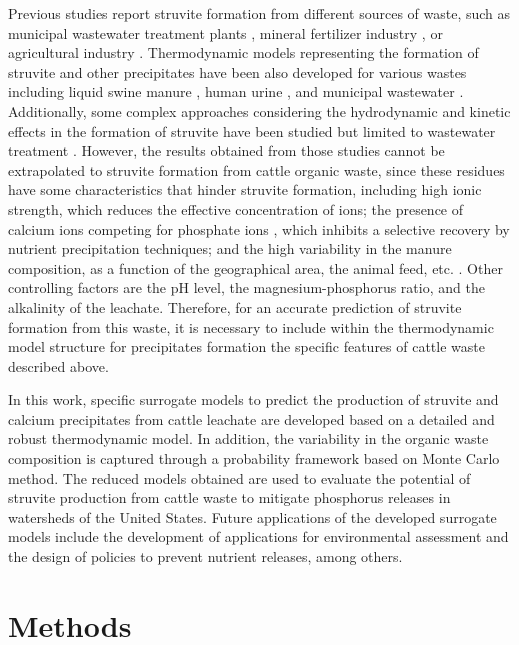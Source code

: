 \documentclass[10pt,a4paper]{article}
\begin{document}
Previous studies report struvite formation from different sources of waste, such as municipal wastewater treatment plants , mineral fertilizer industry , or agricultural industry . Thermodynamic models representing the formation of struvite and other precipitates have been also developed for various wastes including liquid swine manure , human urine , and municipal wastewater . Additionally, some complex approaches considering the hydrodynamic and kinetic effects in the formation of struvite have been studied but limited to wastewater treatment . However, the results obtained from those studies cannot be extrapolated to struvite formation from cattle organic waste, since these residues have some characteristics that hinder struvite formation, including high ionic strength, which reduces the effective concentration of ions; the presence of calcium ions competing for phosphate ions , which inhibits a selective recovery by nutrient precipitation techniques; and the high variability in the manure composition, as a function of the geographical area, the animal feed, etc. . Other controlling factors are the pH level, the magnesium-phosphorus ratio, and the alkalinity of the leachate. Therefore, for an accurate prediction of struvite formation from this waste, it is necessary to include within the thermodynamic model structure for precipitates formation the specific features  of cattle waste described above.

In this work, specific surrogate models to predict the production of struvite and calcium precipitates from cattle leachate are developed based on a detailed and robust thermodynamic model. In addition, the variability in the organic waste composition is captured through a probability framework based on Monte Carlo method. The reduced models obtained are used to evaluate the potential of struvite production from cattle waste to mitigate phosphorus releases in watersheds of the United States. Future applications of the developed surrogate models include the development of applications for environmental assessment and the design of policies to prevent nutrient releases, among others.

\section{Methods}
\end{document}
